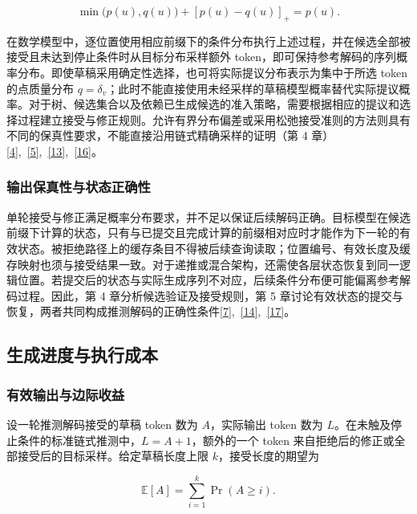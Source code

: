 \documentclass[11pt,a4paper,UTF8,fontset=none,scheme=plain,zihao=-4]{ctexart}
\begin{document}
\[
\min\bigl(p(u),q(u)\bigr)+[p(u)-q(u)]_+=p(u).
\]

在数学模型中，逐位置使用相应前缀下的条件分布执行上述过程，并在候选全部被接受且未达到停止条件时从目标分布采样额外
token，即可保持参考解码的序列概率分布。即使草稿采用确定性选择，也可将实际提议分布表示为集中于所选
token 的点质量分布
\(q=\delta_v\)；此时不能直接使用未经采样的草稿模型概率替代实际提议概率。对于树、候选集合以及依赖已生成候选的准入策略，需要根据相应的提议和选择过程建立接受与修正规则。允许有界分布偏差或采用松弛接受准则的方法则具有不同的保真性要求，不能直接沿用链式精确采样的证明（第
4 章）\protect\hyperlink{ref-leviathan}{{[}4{]}},~\protect\hyperlink{ref-chen}{{[}5{]}},~\protect\hyperlink{ref-zhao2026survey}{{[}13{]}},~\protect\hyperlink{ref-spectr}{{[}16{]}}。

\hypertarget{section-2-1-2}{%
\subsubsection{输出保真性与状态正确性}\label{section-2-1-2}}

单轮接受与修正满足概率分布要求，并不足以保证后续解码正确。目标模型在候选前缀下计算的状态，只有与已提交且完成计算的前缀相对应时才能作为下一轮的有效状态。被拒绝路径上的缓存条目不得被后续查询读取；位置编号、有效长度及缓存映射也须与接受结果一致。对于递推或混合架构，还需使各层状态恢复到同一逻辑位置。若提交后的状态与实际生成序列不对应，后续条件分布便可能偏离参考解码过程。因此，第
4 章分析候选验证及接受规则，第 5
章讨论有效状态的提交与恢复，两者共同构成推测解码的正确性条件\protect\hyperlink{ref-specinfer}{{[}7{]}},~\protect\hyperlink{ref-batchspec}{{[}14{]}},~\protect\hyperlink{ref-twig}{{[}17{]}}。

\hypertarget{section-2-2}{%
\subsection{生成进度与执行成本}\label{section-2-2}}

\hypertarget{section-2-2-1}{%
\subsubsection{有效输出与边际收益}\label{section-2-2-1}}

设一轮推测解码接受的草稿 token 数为 \(A\)，实际输出 token 数为
\(L\)。在未触及停止条件的标准链式推测中，\(L=A+1\)，额外的一个 token
来自拒绝后的修正或全部接受后的目标采样。给定草稿长度上限
\(k\)，接受长度的期望为

\[
\mathbb{E}[A] = \sum_{i=1}^k \Pr(A\ge i).
\]
\end{document}
